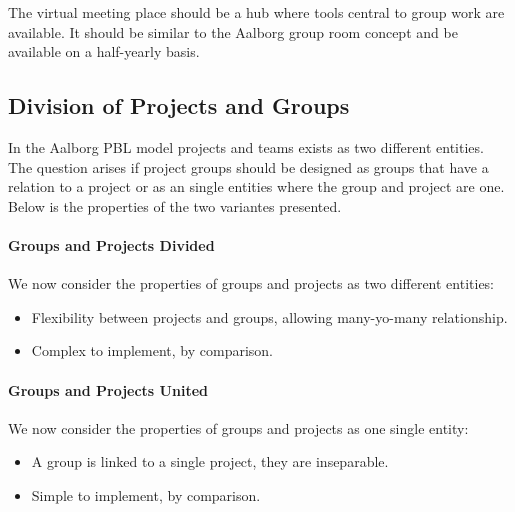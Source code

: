 The virtual meeting place should be a hub where tools central to group work are available.
It should be similar to the Aalborg group room concept and be available on a half-yearly basis.


\subsection{Division of Projects and Groups}
\label{sub:divProjGroup}
In the Aalborg PBL model projects and teams exists as two different entities. 
The question arises if project groups should be designed as groups that have a relation to a project or as an single entities where the group and project are one.
Below is the properties of the two variantes presented.


\paragraph{Groups and Projects Divided} We now consider the properties of groups and projects as two different entities:
\begin{itemize}
	\item Flexibility between projects and groups, allowing many-yo-many relationship.
	\item Complex to implement, by comparison.
\end{itemize}


\paragraph{Groups and Projects United} We now consider the properties of groups and projects as one single entity:
\begin{itemize}
	\item A group is linked to a single project, they are inseparable.
	\item Simple to implement, by comparison.
\end{itemize}

